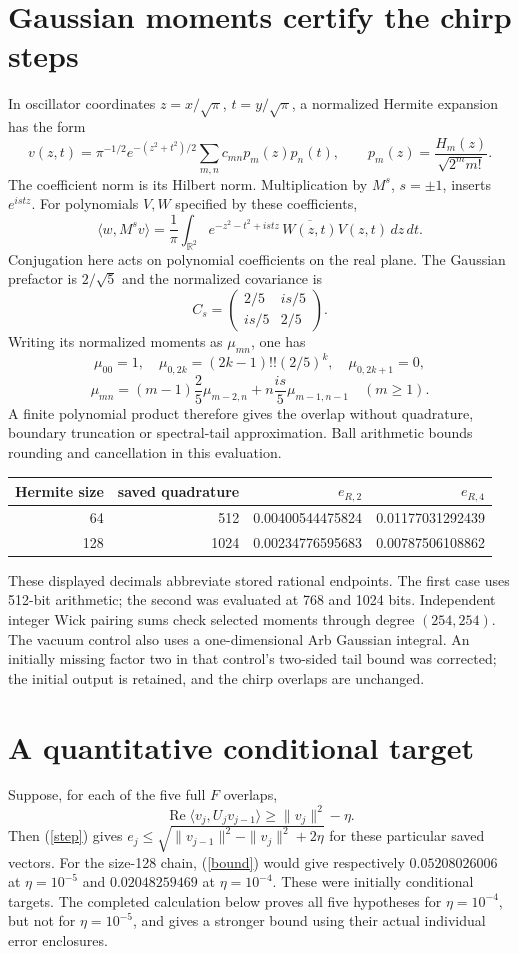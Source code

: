 \documentclass[11pt,a4paper]{article}
\newcommand{\R}{\mathbb R}
\begin{document}
\section{Gaussian moments certify the chirp steps}
In oscillator coordinates $z=x/\sqrt\pi$, $t=y/\sqrt\pi$, a normalized
Hermite expansion has the form
\[
 v(z,t)=\pi^{-1/2}e^{-(z^2+t^2)/2}
        \sum_{m,n}c_{mn}p_m(z)p_n(t),\qquad
 p_m(z)=\frac{H_m(z)}{\sqrt{2^m m!}} .
\]
The coefficient norm is its Hilbert norm. Multiplication by $M^{s}$,
$s=\pm1$, inserts $e^{istz}$. For polynomials $V,W$ specified by
these coefficients,
\[
 \langle w,M^sv\rangle
 =\frac1\pi\int_{\R^2}e^{-z^2-t^2+istz}\,
                    \overline{W(z,t)}V(z,t)\,dz\,dt .
\]
Conjugation here acts on polynomial coefficients on the real plane.
The Gaussian prefactor is $2/\sqrt5$ and the normalized covariance is
\[
 C_s=\begin{pmatrix}2/5&is/5\\is/5&2/5\end{pmatrix}.
\]
Writing its normalized moments as $\mu_{mn}$, one has
\[
 \mu_{00}=1,\quad \mu_{0,2k}=(2k-1)!!(2/5)^k,\quad
 \mu_{0,2k+1}=0,
\]
\[
 \mu_{mn}=(m-1)\frac25\mu_{m-2,n}
                  +n\frac{is}{5}\mu_{m-1,n-1}\quad(m\ge1).
\]
A finite polynomial product therefore gives the overlap without
quadrature, boundary truncation or spectral-tail approximation.
Ball arithmetic bounds rounding and cancellation in this evaluation.

\begin{center}
\begin{tabular}{rrrr}
\toprule
Hermite size & saved quadrature & $e_{R,2}$ & $e_{R,4}$\\
\midrule
64 & 512 & 0.00400544475824 & 0.01177031292439\\
128 & 1024 & 0.00234776595683 & 0.00787506108862\\
\bottomrule
\end{tabular}
\end{center}
These displayed decimals abbreviate stored rational endpoints.
The first case uses 512-bit arithmetic; the second was evaluated at
768 and 1024 bits. Independent integer Wick pairing sums check
selected moments through degree $(254,254)$. The vacuum control also
uses a one-dimensional Arb Gaussian integral. An initially missing
factor two in that control's two-sided tail bound was corrected;
the initial output is retained, and the chirp overlaps are unchanged.

\section{A quantitative conditional target}
Suppose, for each of the five full $F$ overlaps,
\[
 \operatorname{Re}\langle v_j,U_jv_{j-1}\rangle
                           \ge \|v_j\|^2-\eta .
\]
Then (\ref{step}) gives
$e_j\le\sqrt{\|v_{j-1}\|^2-\|v_j\|^2+2\eta}$
for these particular saved vectors. For the size-128 chain,
(\ref{bound}) would give respectively
$0.05208026006$ at $\eta=10^{-5}$ and $0.02048259469$ at
$\eta=10^{-4}$. These were initially conditional targets. The completed
calculation below proves all five hypotheses for $\eta=10^{-4}$, but
not for $\eta=10^{-5}$, and gives a stronger bound using their actual
individual error enclosures.
\end{document}
